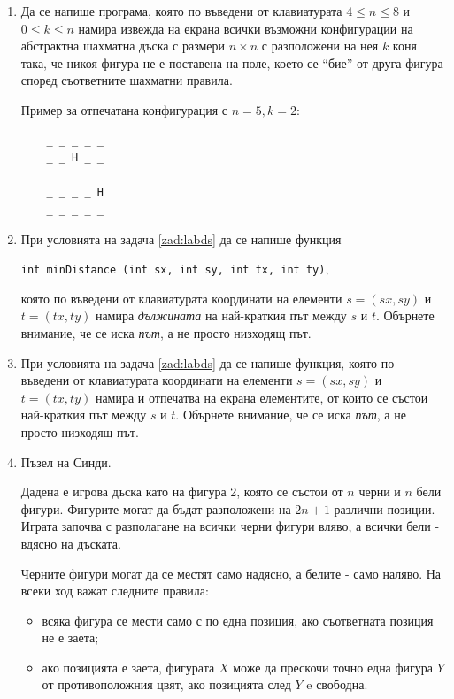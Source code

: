 {\begin{enumerate}[resume]
	Пример: За лабиринта от Фигура \ref{fig:samplelab}(а) условието е изпълнено, но не и за лабиринта отФигура \ref{fig:samplelab}(б).


	\item Да се напише програма, която по въведени от клавиатурата $4 \le n \le 8$ и $0 \le k \le n$ намира извежда на екрана всички възможни конфигурации на абстрактна шахматна дъска с размери $n \times n$ с разположени на нея $k$ коня така, че никоя фигура не е поставена на поле, което се ``бие'' от друга фигура според съответните шахматни правила.

	Пример за отпечатана конфигурация с $n=5, k=2$:
	\begin{verbatim}
	_ _ _ _ _
	_ _ H _ _
	_ _ _ _ _
	_ _ _ _ H
	_ _ _ _ _

	\end{verbatim}


	\item При условията на задача \ref{zad:labds} да се напише функция

	\texttt{int minDistance (int sx, int sy, int tx, int ty)},

	която по въведени от клавиатурата координати на елементи $s=(sx,sy)$ и $t=(tx,ty)$ намира \textit {дължината} на най-краткия път между $s$ и $t$. Обърнете внимание, че се иска \textit{път}, а не просто низходящ път.

	\item

	При условията на задача \ref{zad:labds} да се напише функция, която по въведени от клавиатурата координати на елементи $s=(sx,sy)$ и $t=(tx,ty)$ намира и отпечатва на екрана елементите, от които се състои най-краткия път между $s$ и $t$. Обърнете внимание, че се иска \textit{път}, а не просто низходящ път.


	\item Пъзел на Синди\cite{cindy}.

	Дадена е игрова дъска като на фигура 2, която се състои от $n$ черни и $n$ бели фигури. Фигурите могат да бъдат разположени на $2n+1$ различни позиции. Играта започва с разполагане на всички черни фигури вляво, а всички бели - вдясно на дъската.

	Черните фигури могат да се местят само надясно, а белите - само наляво. На всеки ход важат следните правила:


	\begin{itemize}
		\item всяка фигура се мести само с по една позиция, ако съответната позиция не е заета;
		\item ако позицията е заета, фигурата $X$ може да прескочи точно една фигура $Y$ от противоположния цвят, ако позицията след $Y$ e свободна.
	\end{itemize}


\end{enumerate}}

